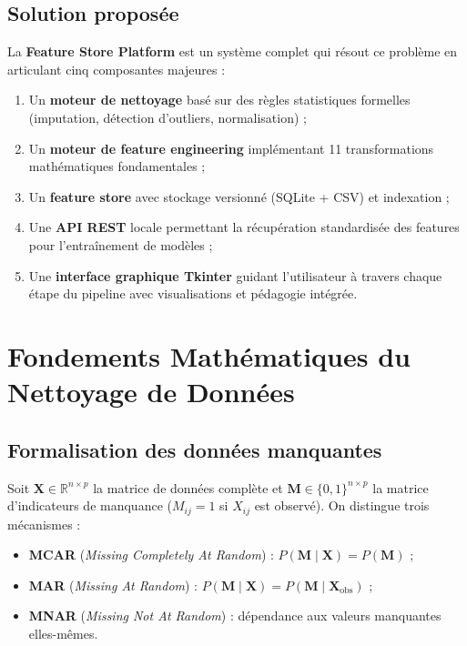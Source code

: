 \documentclass[12pt,a4paper]{article}
\newcounter{defcount}[section]
\newenvironment{definition}[1]{%
  \stepcounter{defcount}%
  \begin{tcolorbox}[defstyle={Définition \thesection.\thedefcount\ — #1}]
}{%
  \end{tcolorbox}
}
\begin{document}
\subsection{Solution proposée}

La \textbf{Feature Store Platform} est un système complet qui résout ce problème en
articulant cinq composantes majeures :

\begin{enumerate}[leftmargin=1.5em]
  \item Un \textbf{moteur de nettoyage} basé sur des règles statistiques formelles
    (imputation, détection d'outliers, normalisation) ;
  \item Un \textbf{moteur de feature engineering} implémentant 11 transformations
    mathématiques fondamentales ;
  \item Un \textbf{feature store} avec stockage versionné (SQLite + CSV) et indexation ;
  \item Une \textbf{API REST} locale permettant la récupération standardisée des
    features pour l'entraînement de modèles ;
  \item Une \textbf{interface graphique Tkinter} guidant l'utilisateur à travers
    chaque étape du pipeline avec visualisations et pédagogie intégrée.
\end{enumerate}

\section{Fondements Mathématiques du Nettoyage de Données}

\subsection{Formalisation des données manquantes}

\begin{definition}{Mécanisme de données manquantes (Rubin, 1976)}
Soit $\mathbf{X} \in \mathbb{R}^{n \times p}$ la matrice de données complète et
$\mathbf{M} \in \{0,1\}^{n \times p}$ la matrice d'indicateurs de manquance
($M_{ij} = 1$ si $X_{ij}$ est observé). On distingue trois mécanismes :
\begin{itemize}
  \item \textbf{MCAR} (\textit{Missing Completely At Random}) :
    $P(\mathbf{M} \mid \mathbf{X}) = P(\mathbf{M})$ ;
  \item \textbf{MAR} (\textit{Missing At Random}) :
    $P(\mathbf{M} \mid \mathbf{X}) = P(\mathbf{M} \mid \mathbf{X}_{\text{obs}})$ ;
  \item \textbf{MNAR} (\textit{Missing Not At Random}) : dépendance aux valeurs
    manquantes elles-mêmes.
\end{itemize}
\end{definition}
\end{document}

